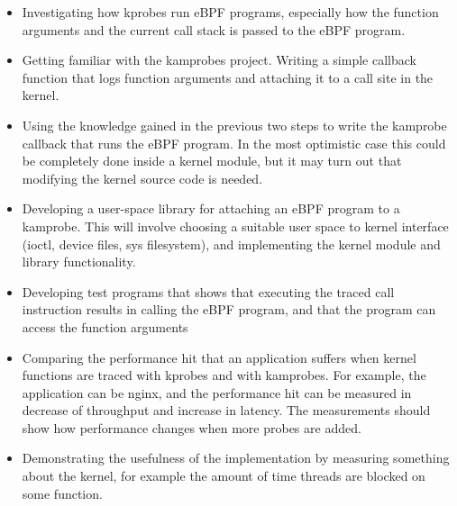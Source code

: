     \begin{itemize}
        \item Investigating how kprobes run eBPF programs, especially how the function arguments and the 
        current call stack is passed to the eBPF program.
       
        \item Getting familiar with the kamprobes project. Writing a simple callback function that logs 
        function arguments and attaching it to a call site in the kernel.

        \item Using the knowledge gained in the previous two steps to write the kamprobe callback that runs
        the eBPF program. In the most optimistic case this could be completely done inside a kernel module,
        but it may turn out that modifying the kernel source code is needed.

        \item Developing a user-space library for attaching an eBPF program to a kamprobe. This will involve 
        choosing a suitable user space to kernel interface (ioctl, device files, sys filesystem),
        and implementing the kernel module and library functionality.

        \item Developing test programs that shows that executing the traced call instruction results in calling the 
        eBPF program, and that the program can access the function arguments



        \item Comparing the performance hit that an application suffers when kernel functions are traced with kprobes
        and with kamprobes. For example, the application can be nginx, and the performance hit can be measured
        in decrease of throughput and increase in latency. The measurements should show how performance changes when
        more probes are added.

        \item Demonstrating the usefulness of the implementation by measuring something about the kernel, for example
        the amount of time threads are blocked on some function.
    \end{itemize}

